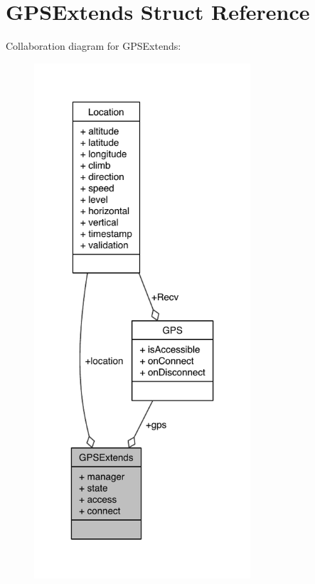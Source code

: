 \section{G\-P\-S\-Extends Struct Reference}
\label{structGPSExtends}


Collaboration diagram for G\-P\-S\-Extends\-:
\nopagebreak
\begin{figure}[H]
\begin{center}
\leavevmode
\includegraphics[width=228pt]{structGPSExtends__coll__graph}
\end{center}
\end{figure}
